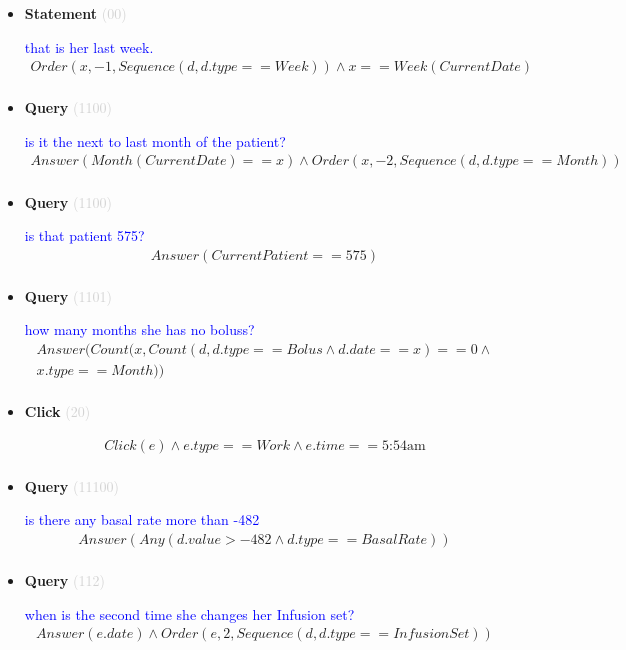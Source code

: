 \documentclass[11pt]{article}
\newcommand{\key}[1]{\textcolor{lightgray}{#1}}
\newcounter{CQuery}
\newcounter{CStatement}
\newcounter{CClick}
\begin{document}
\begin{itemize}
\item
\textbf{Statement\theCStatement} \key{(00)} \addtocounter{CStatement}{1}
\textcolor{blue}{ that is her last week. }
\begin{multline*}
Order(x, -1, Sequence(d, d.type==Week)) \wedge x==Week(CurrentDate) \\ 
\end{multline*}


\item
\textbf{Query\theCQuery} \key{(1100)} \addtocounter{CQuery}{1}
\textcolor{blue}{ is it the next to last month of the patient? }
\begin{multline*}
Answer(Month(CurrentDate)==x) \wedge Order(x, -2, Sequence(d, d.type==Month)) \\ 
\end{multline*}


\item
\textbf{Query\theCQuery} \key{(1100)} \addtocounter{CQuery}{1}
\textcolor{blue}{ is that patient 575? }
\begin{multline*}
Answer(CurrentPatient==575) \\ 
\end{multline*}


\item
\textbf{Query\theCQuery} \key{(1101)} \addtocounter{CQuery}{1}
\textcolor{blue}{ how many months she has no boluss? }
\begin{multline*}
Answer(Count(x, Count(d, d.type==Bolus \wedge d.date==x)==0 \wedge \\ 
x.type==Month)) \\ 
\end{multline*}


\item
\textbf{Click\theCClick} \key{(20)} \addtocounter{CClick}{1}
\textcolor{blue}{  }
\begin{multline*}
Click(e) \wedge e.type==Work \wedge e.time==\mbox{5:54am} \\ 
\end{multline*}


\item
\textbf{Query\theCQuery} \key{(11100)} \addtocounter{CQuery}{1}
\textcolor{blue}{ is there any basal rate more than -482 }
\begin{multline*}
Answer(Any(d.value>-482 \wedge d.type==BasalRate)) \\ 
\end{multline*}


\item
\textbf{Query\theCQuery} \key{(112)} \addtocounter{CQuery}{1}
\textcolor{blue}{ when is the second time she changes her Infusion set? }
\begin{multline*}
Answer(e.date) \wedge Order(e, 2, Sequence(d, d.type==InfusionSet)) \\ 
\end{multline*}



\end{itemize}
\end{document}
